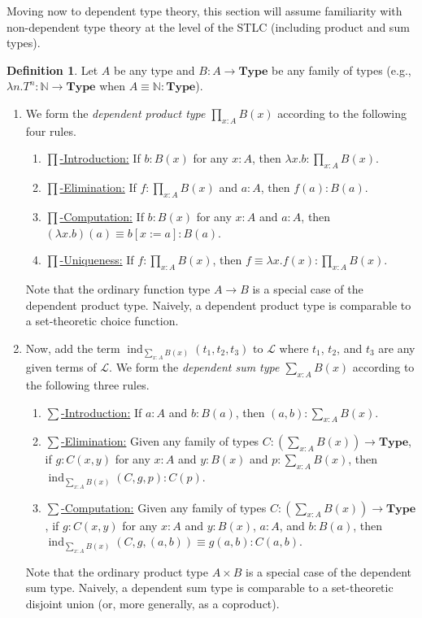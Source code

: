 \documentclass[10pt,letterpaper,cm]{nupset}
\theoremstyle{definition}
\newtheorem*{definition}{Definition}
\newcommand{\N}{\mathbb N}
\newcommand{\1}{\mathbf{1}}
\newcommand{\0}{\vec 0}
\DeclareMathOperator{\ind}{ind}
\begin{document}
Moving now to dependent type theory, this section will assume familiarity with non-dependent type theory at the level of the STLC (including product and sum types).

\begin{definition} Let $A$ be any type and $B : A \to \mathbf{Type}$ be any family of types (e.g., $\lambda n.T^n : \N \to \mathbf{Type}$ when $A \equiv \N : \mathbf{Type}$).  
\begin{enumerate}
\item We form the \textit{dependent product type $\prod_{x:A} B(x)$} according to the following four rules.
\begin{enumerate}
\item \underline{${\prod}$-Introduction:} If $ b: B(x)$ for any $x: A$, then $\lambda x. b : \prod_{x : A} B(x)$.
\item \underline{${\prod}$-Elimination:} If $f:  \prod_{x : A} B(x)$ and $a: A$, then $f(a) : B(a)$.
\item \underline{${\prod}$-Computation:} If $ b: B(x)$ for any $x : A$ and $a: A$, then $(\lambda x.b)(a) \equiv b[x:=a]: B(a)$.
\item \underline{${\prod}$-Uniqueness:} If $f: \prod_{x:A} B(x)$, then $f \equiv \lambda x. f(x) : \prod_{x:A} B(x)$.
\end{enumerate}
Note that the ordinary function type $A \to B$ is a special case of the dependent product type. Naively, a dependent product type is comparable to a set-theoretic choice function. 
\item Now, add the term $\ind_{\sum_{x:A}B(x)}(t_1, t_2, t_3)$ to $\mathcal{L}$ where $t_1$, $t_2$, and $t_3$ are any given terms of $\mathcal{L}$. We form the \textit{dependent sum type $\sum_{x:A} B(x)$} according to the following three rules.
\begin{enumerate}
\item \underline{${\sum}$-Introduction:} If $a: A$ and $b: B(a)$, then $(a, b) : \sum_{x: A} B(x)$.
\item \underline{${\sum}$-Elimination:} Given any family of types $C: (\sum_{x:A} B(x)) \to \mathbf{Type}$, if $g: C(x,y)$ for any $x: A$ and $y: B(x)$ and $p: \sum_{x:A}B(x)$, then $\ind_{\sum_{x:A}B(x)}(C, g, p) : C(p)$.
\item \underline{${\sum}$-Computation:}  Given any family of types $C: (\sum_{x:A} B(x)) \to \mathbf{Type}$, if $g: C(x,y)$ for any $x: A$ and $y: B(x)$, $a: A$, and $b: B(a)$, then $\ind_{\sum_{x:A}B(x)}(C, g, (a,b)) \equiv g(a,b) : C(a,b)$.
\end{enumerate}
Note that the ordinary product type $A  \times B$ is a special case of the dependent sum type. Naively, a dependent sum type is comparable to a set-theoretic disjoint union (or, more generally, as a coproduct).
\end{enumerate}
\end{definition}
\end{document}
